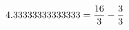 \documentclass[preview]{standalone}
\begin{document}
\begin{align*}
\special{dvisvgm:raw <g id='unique000'>}4.33333333333333 = \frac{16}{3}-\frac{3}{3}\special{dvisvgm:raw </g>}
\end{align*}
\end{document}
